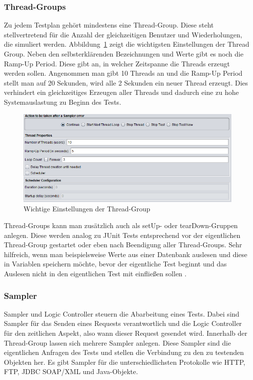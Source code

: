 \documentclass[a4paper,12pt]{article}
\begin{document}
\subsubsection{Thread-Groups}
Zu jedem Testplan gehört mindestens eine Thread-Group. Diese steht stellvertretend für die Anzahl der gleichzeitigen Benutzer und Wiederholungen, die simuliert werden. Abbildung~\ref{fig:thread_group} zeigt die wichtigsten Einstellungen der Thread Group. Neben den selbsterklärenden Bezeichnungen und Werte gibt es noch die Ramp-Up Period. Diese gibt an, in welcher Zeitspanne die Threads erzeugt werden sollen.
Angenommen man gibt 10 Threads an und die Ramp-Up Period stellt man auf 20 Sekunden, wird alle 2 Sekunden ein neuer Thread erzeugt. Dies verhindert ein gleichzeitiges Erzeugen aller Threads und dadurch eine zu hohe Systemauslastung zu Beginn des Tests.

\begin{figure}[htb]%
 \centering
    \includegraphics[width=1\textwidth]{bilder/thread_group.png}
  \caption{Wichtige Einstellungen der Thread-Group}
  \label{fig:thread_group}
\end{figure}

Thread-Groups kann man zusätzlich auch als setUp- oder tearDown-Gruppen anlegen. Diese werden analog zu JUnit Tests entsprechend vor der eigentlichen Thread-Group gestartet oder eben nach Beendigung aller Thread-Groups. Sehr hilfreich, wenn man beispielsweise Werte aus einer Datenbank auslesen und diese in Variablen speichern möchte, bevor der eigentliche Test beginnt und das Auslesen nicht in den eigentlichen Test mit einfließen sollen \cite{online:testingJournals}.

\subsubsection{Sampler}
Sampler und Logic Controller steuern die Abarbeitung eines Tests. Dabei sind Sampler für das Senden eines Requests verantwortlich und die Logic Controller für den zeitlichen Aspekt, also wann dieser Request gesendet wird. Innerhalb der Thread-Group lassen sich mehrere Sampler anlegen. Diese Sampler sind die eigentlichen Anfragen des Tests und stellen die Verbindung zu den zu testenden Objekten her. Es gibt Sampler für die unterschiedlichsten Protokolle wie HTTP, FTP, JDBC SOAP/XML und Java-Objekte. 
\end{document}
